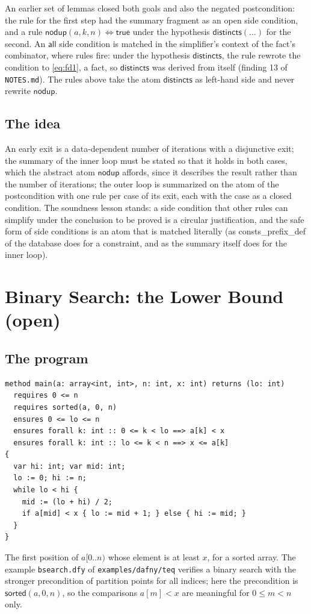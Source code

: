 \documentclass[11pt,a4paper]{article}
\newcommand{\sorted}{\mathsf{sorted}}
\newcommand{\lemma}[1]{\textsf{#1}}
\begin{document}
An earlier set of lemmas closed both goals and also the negated postcondition: the rule for the first step
had the summary fragment as an open side condition, and a rule $\mathsf{nodup}(a, k, n) \Leftrightarrow \mathsf{true}$
under the hypothesis $\mathsf{distincts}(\ldots)$ for the second. An $\mathsf{all}$ side condition is matched
in the simplifier's context of the fact's combinator, where rules fire: under the hypothesis $\mathsf{distincts}$,
the rule rewrote the condition to \eqref{eq:fd1}, a fact, so $\mathsf{distincts}$ was derived from itself
(finding 13 of \texttt{NOTES.md}). The rules above take the atom $\mathsf{distincts}$ as left-hand side
and never rewrite $\mathsf{nodup}$.

\subsection{The idea}
An early exit is a data-dependent number of iterations with a disjunctive exit; the summary of the
inner loop must be stated so that it holds in both cases, which the abstract atom $\mathsf{nodup}$
affords, since it describes the result rather than the number of iterations; the outer loop is summarized
on the atom of the postcondition with one rule per case of its exit, each with the case as a closed
condition. The soundness lesson stands: a side condition that other rules can simplify under the conclusion
to be proved is a circular justification, and the safe form of side conditions is an atom that is matched
literally (as \lemma{consts\_prefix\_def} of the database does for a constraint, and as the summary itself
does for the inner loop).

\section{Binary Search: the Lower Bound (open)}

\subsection{The program}
\begin{lstlisting}
method main(a: array<int, int>, n: int, x: int) returns (lo: int)
  requires 0 <= n
  requires sorted(a, 0, n)
  ensures 0 <= lo <= n
  ensures forall k: int :: 0 <= k < lo ==> a[k] < x
  ensures forall k: int :: lo <= k < n ==> x <= a[k]
{
  var hi: int; var mid: int;
  lo := 0; hi := n;
  while lo < hi {
    mid := (lo + hi) / 2;
    if a[mid] < x { lo := mid + 1; } else { hi := mid; }
  }
}
\end{lstlisting}
The first position of $a[0..n)$ whose element is at least $x$, for a sorted array. The example
\texttt{bsearch.dfy} of \texttt{examples/dafny/teq} verifies a binary search with the stronger
precondition of partition points for all indices; here the precondition is $\sorted(a, 0, n)$, so the
comparisons $a[m] < x$ are meaningful for $0 \le m < n$ only.
\end{document}
